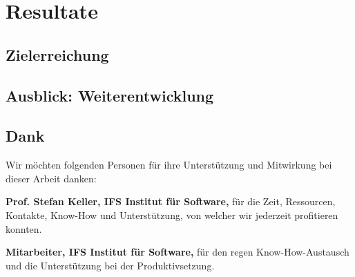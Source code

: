 
\section{Resultate}
\label{Resultate}


\subsection{Zielerreichung}
\label{Resultate:Zielerreichung}


\subsection{Ausblick: Weiterentwicklung}
\label{Resultate:Ausblick: Weiterentwicklung}


\subsection{Dank}
\label{Resultate:Dank}

Wir möchten folgenden Personen für ihre Unterstützung und Mitwirkung bei dieser Arbeit danken:

\textbf{Prof. Stefan Keller, IFS Institut für Software,} für die Zeit, Ressourcen, Kontakte, Know-How und Unterstützung, von welcher wir jederzeit profitieren konnten.

\textbf{Mitarbeiter, IFS Institut für Software,} für den regen Know-How-Austausch und die Unterstützung bei der Produktivsetzung.
